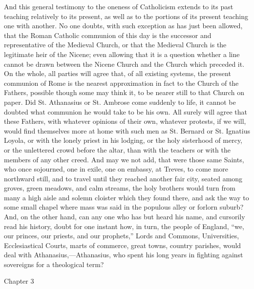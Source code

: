 And this general testimony to the oneness of
Catholicism extends to its past teaching relatively to
its present, as well as to the portions of its present
teaching one with another. No one doubts, with such
exception as has just been allowed, that the Roman
Catholic communion of this day is the successor and
representative of the Medieval Church, or that the
Medieval Church is the legitimate heir of the Nicene;
even allowing that it is a question whether a line cannot
be drawn between the Nicene Church and the Church which
preceded it. On the whole, all parties will agree that,
of all existing systems, the present communion of Rome is
the nearest approximation in fact to the Church of the
Fathers, possible though some may think it, to be nearer
still to that Church on paper. Did St. Athanasius or St.
Ambrose come suddenly to life, it cannot be doubted what
communion he would take to be his own. All surely will
agree that these Fathers, with whatever opinions of their
own, whatever protests, if we will, would find themselves
more at home with such men as St. Bernard or St. Ignatius
Loyola, or with the lonely priest in his lodging, or the
holy sisterhood of mercy, or the unlettered crowd before
the altar, than with the teachers or with the members of
any other creed. And may we not add, that were those same
Saints, who once sojourned, one in exile, one on embassy,
at Treves, to come more northward still, and to travel
until they reached another fair city, seated among
groves, green meadows, and calm streams, the holy
brothers would turn from many a high aisle and solemn
cloister which they found there, and ask the way to some
small chapel where mass was said in the populous alley or
forlorn suburb? And, on the other hand, can any one who
has but heard his name, and cursorily read his history,
doubt for one instant how, in turn, the people of
England, ``we, our princes, our priests, and our
prophets,'' Lords and Commons, Universities,
Ecclesiastical Courts, marts of commerce, great towns,
country parishes, would deal with
Athanasius,—Athanasius, who spent his long years in
fighting against sovereigns for a theological term?

Chapter 3




